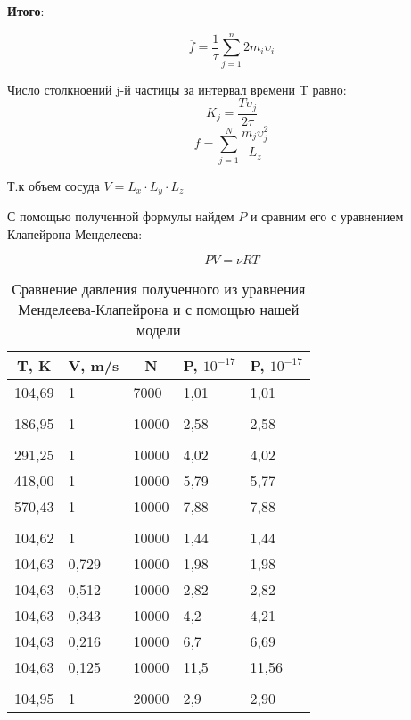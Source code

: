 \documentclass[twoside,twocolumn]{article}
\theoremstyle{plain}
\theoremstyle{definition}
\begin{document}
\textbf{Итого}:

\begin{equation}
\overline{f} = \dfrac{1}{\tau} \sum_{j=1}^n 2 m_i \upsilon_i
\end{equation}

Число столкноений j-й частицы за интервал времени T равно:
\[K_j = \dfrac{T \upsilon_j }{2\tau} \]
\[\overline{f} = \sum_{j = 1}^N \dfrac{m_j \upsilon_j^2}{L_z}\]

Т.к объем сосуда $V = L_x \cdot L_y \cdot L_z$

\begin{center}
\end{center}

\indent С помощью полученной формулы найдем $P$ и сравним его с уравнением Клапейрона-Менделеева:

\[PV = \nu R T \]

\begin{table}[h!]
\centering
\label{Table 1}
\begin{tabular}{|l|l|l|l|l|}
\hline
\multicolumn{1}{|c|}{T, K} & \multicolumn{1}{c|}{V, m/s} & \multicolumn{1}{c|}{N} & \multicolumn{1}{c|}{P, $10^{-17}$} & \multicolumn{1}{c|}{P, $10^{-17}$} \\ \hline
104,69 & 1 & 7000 & 1,01 & 1,01                                    \\
& & & &                                         \\
186,95 & 1 & 10000 & 2,58 & 2,58                                    \\
& & & &                                         \\
291,25 & 1 & 10000 & 4,02 & 4,02                                    \\
418,00 & 1 & 10000 & 5,79 & 5,77                                    \\
570,43 & 1 & 10000 & 7,88 & 7,88                                    \\
& & & &                                         \\
104,62 & 1 & 10000 & 1,44 & 1,44                                    \\
104,63 & 0,729 & 10000 & 1,98 & 1,98                                    \\
104,63 & 0,512 & 10000 & 2,82 & 2,82                                    \\
104,63 & 0,343 & 10000 & 4,2 & 4,21                                    \\
104,63 & 0,216 & 10000 & 6,7 & 6,69                                    \\
104,63 & 0,125 & 10000 & 11,5 & 11,56                                   \\
& & & &                                         \\
104,95 & 1 & 20000 & 2,9 & 2,90                                    \\ \hline
\end{tabular}
\caption{Сравнение давления полученного из уравнения Менделеева-Клапейрона и с помощью нашей модели}
\end{table}
\end{document}
